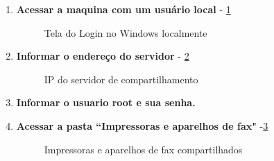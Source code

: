 \begin{enumerate}
	\item \textbf{Acessar a maquina com um usuário local} - \ref{login_windows_local}
		\begin{figure}[ht]
		   	\centering
		   	\caption{Tela do Login no Windows localmente}
		    \label{login_windows_local}
		\end{figure}
		
	\item \textbf{Informar o endereço do servidor} - \ref{server_ip}	
	\begin{figure}[ht]
	   	\centering
	   	\caption{IP do servidor de compartilhamento}
	    \label{server_ip}
	\end{figure}
		
\pagebreak
	
	\item \textbf{Informar o usuario root e sua senha.} %
	
	
	\item \textbf{Acessar a pasta ``Impressoras e aparelhos de fax"} -\ref{impressora_aparelho_fax}
	\begin{figure}[ht]
	   	\centering
	   	\caption{Impressoras e aparelhos de fax compartilhados}
	    \label{impressora_aparelho_fax}
	\end{figure}


\end{enumerate}
